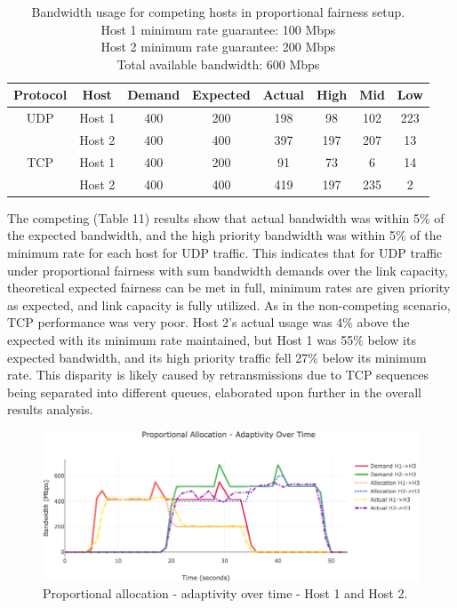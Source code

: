 \documentclass[accepted,single]{gipaper}
\begin{document}
\begin{table}[h]
	\label{prop_c}
	\vspace{-2mm}
	\begin{center}
		\begin{small}
		\setlength\tabcolsep{1.5pt}
			\begin{tabular}{cccccccc}
				Protocol & Host & Demand & Expected & Actual & High & Mid & Low\\
				\hline
				UDP & Host 1 & 400 & 200 & 198 & 98 & 102 & 223\\
				    & Host 2 & 400 & 400 & 397 & 197 & 207 & 13\\
				\hline
				TCP & Host 1 & 400 & 200 & 91 & 73 & 6 & 14\\
				    & Host 2 & 400 & 400 & 419 & 197 & 235 & 2\\
			\end{tabular}
		\end{small}
	\end{center}
	\caption{Bandwidth usage for competing hosts in proportional fairness setup.\\
	Host 1 minimum rate guarantee: 100 Mbps\\
	Host 2 minimum rate guarantee: 200 Mbps\\	
	Total available bandwidth: 600 Mbps}
	\vspace{-3mm}
\end{table}

The competing (Table 11) results show that actual bandwidth was within 5\% of the expected bandwidth, and the high priority bandwidth was within 5\% of the minimum rate for each host for UDP traffic. This indicates that for UDP traffic under proportional fairness with sum bandwidth demands over the link capacity, theoretical expected fairness can be met in full, minimum rates are given priority as expected, and link capacity is fully utilized. As in the non-competing scenario, TCP performance was very poor. Host 2's actual usage was 4\% above the expected with its minimum rate maintained, but Host 1 was 55\% below its expected bandwidth, and its high priority traffic fell 27\% below its minimum rate. This disparity is likely caused by retransmissions due to TCP sequences being separated into different queues, elaborated upon further in the overall results analysis.

\begin{figure}
	\centering
	\includegraphics[width=6in]{figs/dbap_ot_udp_both.png}
	\caption{ Proportional allocation - adaptivity over time - Host 1 and Host 2. } \label{dbap_ot_both}
\end{figure}
\end{document}
